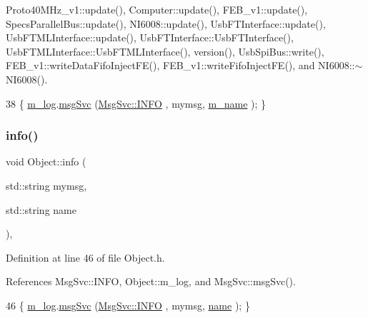 Proto40\+M\+Hz\+\_\+v1\+::update(), Computer\+::update(), F\+E\+B\+\_\+v1\+::update(), Specs\+Parallel\+Bus\+::update(), N\+I6008\+::update(), Usb\+F\+T\+Interface\+::update(), Usb\+F\+T\+M\+L\+Interface\+::update(), Usb\+F\+T\+Interface\+::\+Usb\+F\+T\+Interface(), Usb\+F\+T\+M\+L\+Interface\+::\+Usb\+F\+T\+M\+L\+Interface(), version(), Usb\+Spi\+Bus\+::write(), F\+E\+B\+\_\+v1\+::write\+Data\+Fifo\+Inject\+F\+E(), F\+E\+B\+\_\+v1\+::write\+Fifo\+Inject\+F\+E(), and N\+I6008\+::$\sim$\+N\+I6008().


\begin{DoxyCode}
38 \{ \hyperlink{classObject_a0d269813dd7ac1f24bc143031e2963f2}{m\_log}.\hyperlink{classMsgSvc_ad25f18047920cc59a314e5098259711c}{msgSvc} (\hyperlink{classMsgSvc_ae671eb7301996cd049d2da8a65925926ad2fcf3f3e734fc41ee097cc23670ce51}{MsgSvc::INFO}    , mymsg, \hyperlink{classObject_a8b83c95c705d2c3ba0d081fe1710f48d}{m\_name} ); \}
\end{DoxyCode}
\mbox{\label{classObject_a1ca123253dfd30fc28b156f521dcbdae}} 
\subsubsection{\texorpdfstring{info()}{info()}\hspace{0.1cm}{\footnotesize\ttfamily [2/2]}}
{\footnotesize\ttfamily void Object\+::info (\begin{DoxyParamCaption}\item[{std\+::string}]{mymsg,  }\item[{std\+::string}]{name }\end{DoxyParamCaption})\hspace{0.3cm}{\ttfamily [inline]}, {\ttfamily [inherited]}}



Definition at line 46 of file Object.\+h.



References Msg\+Svc\+::\+I\+N\+FO, Object\+::m\+\_\+log, and Msg\+Svc\+::msg\+Svc().


\begin{DoxyCode}
46 \{ \hyperlink{classObject_a0d269813dd7ac1f24bc143031e2963f2}{m\_log}.\hyperlink{classMsgSvc_ad25f18047920cc59a314e5098259711c}{msgSvc} (\hyperlink{classMsgSvc_ae671eb7301996cd049d2da8a65925926ad2fcf3f3e734fc41ee097cc23670ce51}{MsgSvc::INFO}    , mymsg, \hyperlink{classObject_a300f4c05dd468c7bb8b3c968868443c1}{name} ); \}
\end{DoxyCode}
\mbox{\label{classICECALv3_abf7281fad80b80b70c5b13ce66ba3451}} 
